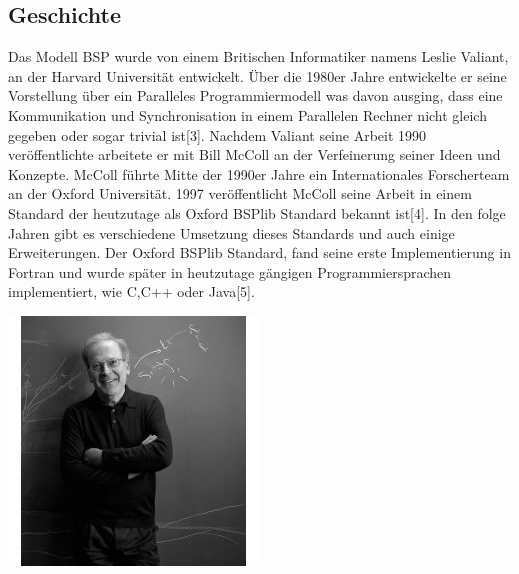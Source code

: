 \documentclass[a4paper,10pt]{scrartcl}
\begin{document}
\subsection{Geschichte}
\begin{minipage}{0.6\textwidth}
Das Modell BSP wurde von einem Britischen Informatiker namens Leslie Valiant, an der Harvard Universität entwickelt. Über die 1980er Jahre entwickelte er seine Vorstellung über ein Paralleles Programmiermodell was davon ausging, dass eine Kommunikation und Synchronisation in einem Parallelen Rechner nicht gleich gegeben oder sogar trivial ist[3]. Nachdem Valiant seine Arbeit 1990 veröffentlichte arbeitete er mit Bill McColl an der Verfeinerung seiner Ideen und Konzepte. 
McColl führte Mitte der 1990er Jahre ein Internationales Forscherteam an der Oxford Universität. 1997 veröffentlicht McColl seine Arbeit in einem Standard der heutzutage als Oxford BSPlib Standard bekannt ist[4]. In den folge Jahren gibt es verschiedene Umsetzung dieses Standards und auch einige Erweiterungen. Der Oxford BSPlib Standard, fand seine erste Implementierung in Fortran und wurde später in heutzutage gängigen Programmiersprachen implementiert, wie C,C++ oder Java[5].
\end{minipage}
\begin{minipage}{0.4\textwidth}

\includegraphics[scale=1.3]{LeslieValiantBW.png}



\end{minipage}
\end{document}
